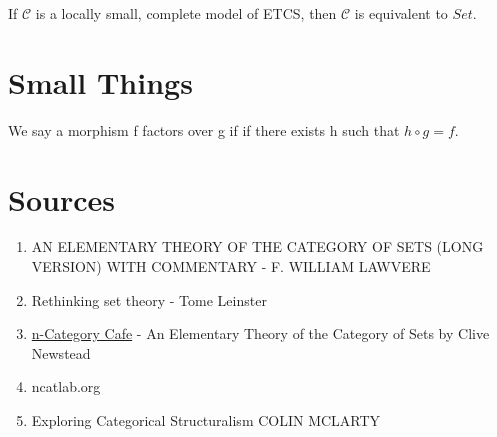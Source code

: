 \begin{theorem}
If $\mathcal{C}$ is a locally small, complete model of ETCS, then $\mathcal{C}$ is equivalent to $Set$.
\end{theorem}




\clearpage

\begin{appendix}

\section{Small Things}

\begin{remark}
We say a morphism f factors over g if if there exists h such that $h \circ g = f$.
\end{remark}


\section{Sources}

\begin{enumerate}
\item AN ELEMENTARY THEORY
OF THE CATEGORY OF SETS (LONG VERSION)
WITH COMMENTARY - F. WILLIAM LAWVERE
\item Rethinking set theory - Tome Leinster
\item \href{https://golem.ph.utexas.edu/category/2014/01/an_elementary_theory_of_the_ca.html}{n-Category Cafe} - An Elementary Theory of the Category of Sets by Clive Newstead
\item ncatlab.org
\item Exploring Categorical Structuralism
COLIN MCLARTY
\end{enumerate}

\end{appendix}



